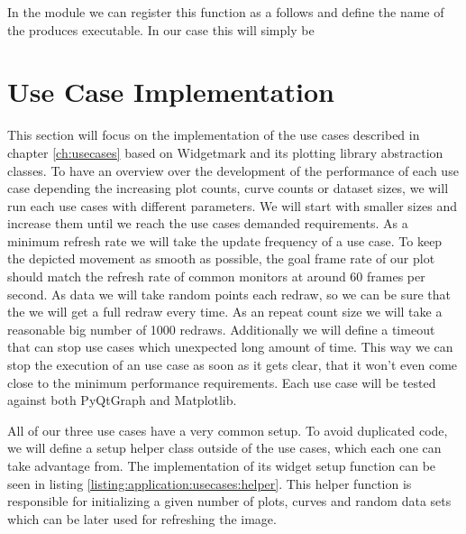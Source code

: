 

In the module  we can register this function as
a  follows and define the name of the
produces executable. In our case this will simply be





\section{Use Case Implementation}

This section will focus on the implementation of the use cases described in
chapter \ref{ch:usecases} based on Widgetmark and its plotting library
abstraction classes. To have an overview over the development of the performance
of each use case depending the increasing plot counts, curve counts or dataset
sizes, we will run each use cases with different parameters. We will start with
smaller sizes and increase them until we reach the use cases demanded
requirements. As a minimum refresh rate we will take the update frequency of a
use case. To keep the depicted movement as smooth as possible, the goal frame
rate of our plot should match the refresh rate of common monitors at around 60
frames per second. As data we will take random points each redraw, so we can be
sure that the we will get a full redraw every time. As an repeat count size we
will take a reasonable big number of 1000 redraws. Additionally we will define a
timeout that can stop use cases which unexpected long amount of time. This way
we can stop the execution of an use case as soon as it gets clear, that it won't
even come close to the minimum performance requirements. Each use case will be
tested against both PyQtGraph and Matplotlib.

All of our three use cases have a very common setup. To avoid duplicated code,
we will define a setup helper class outside of the use cases, which each one can
take advantage from. The implementation of its widget setup function can be seen
in listing \ref{listing:application:usecases:helper}. This helper function is
responsible for initializing a given number of plots, curves and random data
sets which can be later used for refreshing the image.

